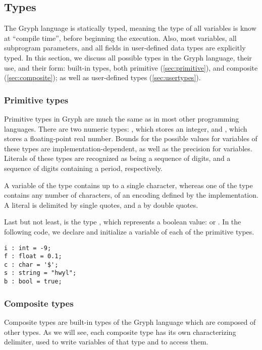 \subsection{Types}
\label{sec:types}
The Gryph language is statically typed, meaning the type of all variables is know at ``compile time'', before beginning the execution. Also, most variables, all subprogram parameters, and all fields in user-defined data types are explicitly typed. In this section, we discuss all possible types in the Gryph language, their use, and their form: built-in types, both primitive (\autoref{sec:primitive}), and composite (\autoref{sec:composite}); as well as user-defined types (\autoref{sec:usertypes}).
\subsubsection{Primitive types}
\label{sec:primitive}
Primitive types in Gryph are much the same as in most other programming languages. There are two numeric types: , which stores an integer, and , which stores a floating-point real number. Bounds for the possible values for variables of these types are implementation-dependent, as well as the precision for  variables. Literals of these types are recognized as being a sequence of digits, and a sequence of digits containing a period, respectively.

A variable of the  type contains up to a single character, whereas one of the  type contains any number of characters, of an encoding defined by the implementation. A  literal is delimited by single quotes, and a  by double quotes. 

Last but not least, is the type , which represents a boolean value:  or . In the following code, we declare and initialize a variable of each of the primitive types.
\begin{lstlisting}[language=Gryph]
i : int = -9;
f : float = 0.1;
c : char = '$';
s : string = "hwyl";
b : bool = true;
\end{lstlisting}

\subsubsection{Composite types}
\label{sec:composite}
Composite types are built-in types of the Gryph language which are composed of other types. As we will see, each composite type has its own characterizing delimiter, used to write variables of that type and to access them.

